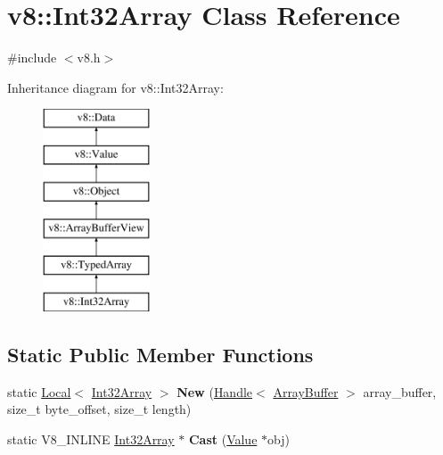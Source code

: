 \hypertarget{classv8_1_1_int32_array}{}\section{v8\+:\+:Int32\+Array Class Reference}
\label{classv8_1_1_int32_array}


{\ttfamily \#include $<$v8.\+h$>$}

Inheritance diagram for v8\+:\+:Int32\+Array\+:\begin{figure}[H]
\begin{center}
\leavevmode
\includegraphics[height=6.000000cm]{classv8_1_1_int32_array}
\end{center}
\end{figure}
\subsection*{Static Public Member Functions}
\begin{DoxyCompactItemize}
\item 
\hypertarget{classv8_1_1_int32_array_a41fa255626b8e00e9cc9f5d4e0c518d5}{}static \hyperlink{classv8_1_1_local}{Local}$<$ \hyperlink{classv8_1_1_int32_array}{Int32\+Array} $>$ {\bfseries New} (\hyperlink{classv8_1_1_local}{Handle}$<$ \hyperlink{classv8_1_1_array_buffer}{Array\+Buffer} $>$ array\+\_\+buffer, size\+\_\+t byte\+\_\+offset, size\+\_\+t length)\label{classv8_1_1_int32_array_a41fa255626b8e00e9cc9f5d4e0c518d5}

\item 
\hypertarget{classv8_1_1_int32_array_afe7cdf534deadc3d872d8a43778809f1}{}static V8\+\_\+\+I\+N\+L\+I\+N\+E \hyperlink{classv8_1_1_int32_array}{Int32\+Array} $\ast$ {\bfseries Cast} (\hyperlink{classv8_1_1_value}{Value} $\ast$obj)\label{classv8_1_1_int32_array_afe7cdf534deadc3d872d8a43778809f1}

\end{DoxyCompactItemize}
